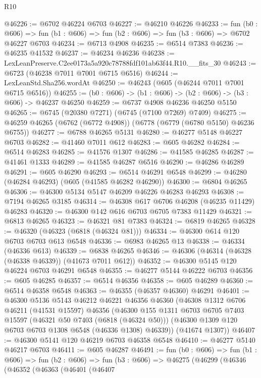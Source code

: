 \begin{lexlean}{R10}
\begin{coremodule}
@46226 := @6702 @46224 @6703
@46227 := @46210 @46226
@46233 := fun (b0 : @606) =>
  fun (b1 : @606) => fun (b2 : @606) => fun (b3 : @606) => @6702 @46227 @6703
@46234 := @6713 @4908
@46235 := @6514 @7383
@46236 := @46235 @41532
@46237 := @46234 @46236
@46238 := LexLeanPreserve.C2ee0173a5a920c78788fdf101ab63f44.R10.__fits_30
@46243 := @6723 (@46238 @7011 @7001 @6715 @6516)
@46244 := LexLeanStd.Sha256.wordAt
@46250 := @46243 (@605 (@46244 @7011 @7001 @6715 @6516))
@46255 := (b0 : @606) -> (b1 : @606) -> (b2 : @606) -> (b3 : @606) -> @46237 @46250
@46259 := @6737 @4908 @46236 @46250 @5150
@46265 := @6745 (@20380 @7271) (@6745 (@7100 @7269) @7409)
@46275 := @46259 @46265 (@6762 (@6772 @4908)) (@6778 (@6779 (@6780 @5150) @46236 @6755))
@46277 := @6788 @46265 @5131
@46280 := @46277 @5148 @46227 @6703
@46282 := @41460 @7011 @612
@46283 := @605 @46282
@46284 := @6514 @46283
@46285 := @41576 @1307
@46286 := @41585 @46285
@46287 := @41461 @1333
@46289 := @41585 @46287 @6516
@46290 := @46286 @46289
@46291 := @605 @46290
@46293 := @6514 @46291 @6548
@46299 := @46280 (@46284 @46293) (@605 (@41585 @46282 @46290))
@46300 := @6804 @46265
@46306 := @46300 @5134 @5147 @46209 @46226 @46283 @46293
@46308 := @7194 @46265 @3185
@46314 := @46308 @617 @6706 @46208 (@46235 @11429) @46283
@46320 := @46300 @142 @616 @6703 @6705 @7383 @11429
@46321 := @6813 @46265
@46323 := @46321 @81 @7383
@46324 := @6819 @46265
@46328 := @46320 (@46323 (@6818 (@46324 @81)))
@46334 := @46300 @614 @120 @6703 @6703 @613 @6548
@46336 := @6983 @46265 @13
@46338 := @46334 (@46336 @613)
@46339 := @6838 @46265
@46346 := @46306 (@46314 (@46328 (@46338 @46339)) (@41673 @7011 @612))
@46352 := @46300 @5145 @120 @46224 @6703 @46291 @6548
@46355 := @46277 @5144 @46222 @6703
@46356 := @605 @46285
@46357 := @6514 @46356
@46358 := @605 @46289
@46360 := @6514 @46358 @6548
@46363 := @46355 (@46357 @46360) @46291
@46401 := @46300
    @5136
    @5143
    @46212
    @46221
    @46356
    @46360
    (@46308
      @1312
      @6706
      @46211
      (@41531 @15597)
      @46356
      (@46300
        @155
        @1311
        @6703
        @6705
        @7403
        @15597
        (@46321 @50 @7403 (@6818 (@46324 @50)))
        (@46300 @1309 @120 @6703 @6703 @1308 @6548 (@46336 @1308) @46339))
      (@41674 @1307))
@46407 := @46300 @5141 @120 @46219 @6703 @46358 @6548
@46410 := @46277 @5140 @46217 @6703
@46411 := @605 @46287
@46491 := fun (b0 : @606) =>
  fun (b1 : @606) =>
  fun (b2 : @606) =>
  fun (b3 : @606) =>
  @46275
    (@46299
      (@46346
        (@46352
          (@46363
            (@46401
              (@46407

\end{coremodule}
\end{lexlean}
